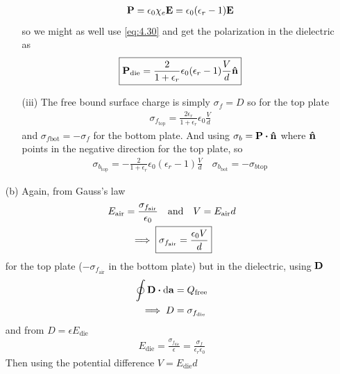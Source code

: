 \documentclass[../main.tex]{subfiles}
\begin{document}
\begin{itemize}
\begin{itemize}
\begin{align*}
            \vb P = \epsilon_0 \chi_e \vb E = \epsilon_0 (\epsilon_r - 1) \vb E
        \end{align*}
        so we might as well use \eqref{eq:4.30} and get the polarization in the dielectric as 
        \begin{align*}
            \boxed{
                \vb P_\text{die} = \frac{2}{1 + \epsilon_r} \epsilon_0 (\epsilon_r - 1) \frac{V}{d} \vu n
            }
        \end{align*}
        \item [(iii)] The free bound surface charge is simply $\sigma_f = D$ so for the top plate
        \begin{align*}
            \boxed{
                \sigma_{f_\text{top}} = \frac{2\epsilon_r}{1 + \epsilon_r} \epsilon_0 \frac{V}{d}
            }
        \end{align*}
        and $\sigma_{f\text{bot}} = -\sigma_f$ for the bottom plate. And using $\sigma_b = \vb P \vdot \vu n$ where $\vu n$ points in the negative direction for the top plate, so
        \begin{align*}
            \boxed{
                \sigma_{b_\text{top}} = -\frac{2}{1 + \epsilon_r} \epsilon_0 (\epsilon_r - 1) \frac{V}{d} \quad \sigma_{b_\text{bot}} = -\sigma_{b\text{top}}
            }
        \end{align*}
    \end{itemize}
    \item [(b)] Again, from Gauss's law 
    \begin{gather*}
        E_\text{air} = \frac{\sigma_{f_\text{air}}}{\epsilon_0} \qand V = E_\text{air} d \\
        \implies \boxed{
            \sigma_{f_\text{air}} = \frac{\epsilon_0 V}{d}
        }
    \end{gather*}
    for the top plate ($-\sigma_{f_\text{air}}$ in the bottom plate) but in the dielectric, using $\vb D$
    \begin{align*}
        \oint \vb D \vdot \dd{\vb a} &= Q_\text{free} \\
        \implies D &= \sigma_{f_\text{die}}
    \end{align*}
    and from $D = \epsilon E_\text{die}$
    \begin{align*}
        E_\text{die} = \frac{\sigma_{f_\text{die}}}{\epsilon} = \frac{\sigma_f}{\epsilon_r \epsilon_0}
    \end{align*}
    Then using the potential difference $V = E_\text{die} d$
    \begin{align*}

\end{align*}
\end{itemize}
\end{document}
